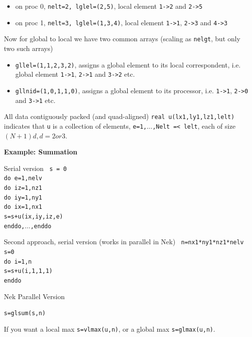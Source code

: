 \begin{itemize}
\item on proc 0, {\tt nelt=2, lglel=(2,5)}, local element {\tt 1->2} and {\tt 2->5}
\item on proc 1, {\tt nelt=3, lglel=(1,3,4)}, local element {\tt 1->1}, {\tt 2->3} and {\tt 4->3}
\end{itemize}
		  
Now for global to local we have two common arrays (scaling as {\tt nelgt}, but only two such arrays)

\begin{itemize}
\item {\tt gllel=(1,1,2,3,2)}, assigns a global element to its local correspondent, i.e. global element {\tt 1->1}, {\tt 2->1} and {\tt 3->2} etc.
\item {\tt gllnid=(1,0,1,1,0)}, assigns a global element to its processor, i.e. {\tt 1->1}, {\tt 2->0} and {\tt 3->1} etc.
\end{itemize}



All data contiguously packed (and quad-aligned) {\tt real  u(lx1,ly1,lz1,lelt)} indicates that {\tt u} is a collection of elements, {\tt e=1,$\ldots$,Nelt =< lelt}, each of size $(N+1)d, d=2 or 3$.

\textbf{Example: Summation}

Serial version
{\tt
s = 0 \\
do e=1,nelv \\
do iz=1,nz1 \\
do iy=1,ny1 \\
do ix=1,nx1 \\
s=s+u(ix,iy,iz,e) \\
enddo,$\ldots$,enddo}

Second approach, serial version (works in parallel in Nek)
{\tt
n=nx1*ny1*nz1*nelv \\
s=0 \\
do i=1,n \\
s=s+u(i,1,1,1) \\
enddo
}

Nek Parallel Version

{\tt s=glsum(s,n)}

If you want a local max {\tt s=vlmax(u,n)}, or a global max {\tt s=glmax(u,n)}.


